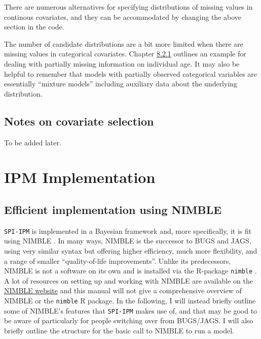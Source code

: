 \documentclass[
]{book}
\begin{document}
There are numerous alternatives for specifying distributions of missing values
in continous covariates, and they can be accommodated by changing the above
section in the code.

The number of candidate distributions are a bit more limited when there are
missing values in categorical covariates.
Chapter \protect\hyperlink{ux5cux23ux5cux23ux5cux2520Includingux5cux2520partiallyux5cux2520observedux5cux2520ageux5cux2520information}{8.2.1} outlines an
example for dealing with partially missing information on individual age. It
may also be helpful to remember that models with partially observed categorical
variables are essentially ``mixture models'' including auxiliary data about the
underlying distribution.

\hypertarget{notes-on-covariate-selection}{%
\section{Notes on covariate selection}\label{notes-on-covariate-selection}}

To be added later.

\hypertarget{IPMImp}{%
\chapter{IPM Implementation}\label{IPMImp}}

\hypertarget{efficient-implementation-using-nimble}{%
\section{Efficient implementation using NIMBLE}\label{efficient-implementation-using-nimble}}

\texttt{SPI-IPM} is implemented in a Bayesian framework and, more specifically, it is
fit using NIMBLE \citep{devalpine2017}. In many ways, NIMBLE is the successor to
BUGS and JAGS, using very similar syntax but offering higher efficiency, much
more flexibility, and a range of smaller ``quality-of-life improvements''.
Unlike its predecessors, NIMBLE is not a software on its own and is installed
via the R-package \texttt{nimble} \citep{nimbleR}. A lot of resources on setting up and
working with NIMBLE are available on the \href{https://r-nimble.org/}{NIMBLE website}
and this manual will not give a comprehensive overview of NIMBLE or the
\texttt{nimble} R package.
In the following, I will instead briefly outline some of
NIMBLE's features that \texttt{SPI-IPM} makes use of, and that may be good to be aware
of particularly for people switching over from BUGS/JAGS. I will also briefly
outline the structure for the basic call to NIMBLE to run a model.
\end{document}
